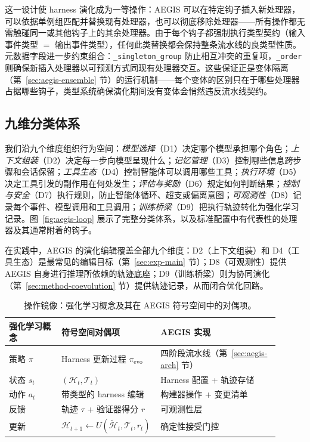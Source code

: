 这一设计使 harness 演化成为一等操作：AEGIS 可以在特定钩子插入新处理器，可以依据单例组匹配并替换现有处理器，也可以彻底移除处理器——所有操作都无需触碰同一或其他钩子上的其余处理器。由于每个钩子都强制执行类型契约（输入事件类型 $=$ 输出事件类型），任何此类替换都会保持整条流水线的良类型性质。元数据字段进一步约束组合：\texttt{\_singleton\_group} 防止相互冲突的重复项，\texttt{\_order} 则确保新插入处理器以可预测方式同现有处理器交互。这些保证正是变体隔离（第~\ref{sec:aegis-ensemble} 节）的运行机制——每个变体的区别只在于哪些处理器占据哪些钩子，类型系统确保演化期间没有变体会悄然违反流水线契约。

\subsection{九维分类体系}
\label{sec:foundry-taxonomy}

我们沿九个维度组织行为空间：\textit{模型选择}（D1）决定哪个模型承担哪个角色；\textit{上下文组装}（D2）决定每一步向模型呈现什么；\textit{记忆管理}（D3）控制哪些信息跨步骤和会话保留；\textit{工具生态}（D4）控制智能体可以调用哪些工具；\textit{执行环境}（D5）决定工具引发的副作用在何处发生；\textit{评估与奖励}（D6）规定如何判断结果；\textit{控制与安全}（D7）执行规则，防止智能体循环、超支或偏离意图；\textit{可观测性}（D8）记录每个事件、模型调用和工具调用；\textit{训练桥梁}（D9）把执行轨迹转化为强化学习记录。图~\ref{fig:aegis-loop} 展示了完整分类体系，以及标准配置中有代表性的处理器及其通常附着的钩子。

在实践中，AEGIS 的演化编辑覆盖全部九个维度：D2（上下文组装）和 D4（工具生态）是最常见的编辑目标（第~\ref{sec:exp-main} 节）；D8（可观测性）提供 AEGIS 自身进行推理所依赖的轨迹底座；D9（训练桥梁）则为协同演化（第~\ref{sec:method-coevolution} 节）提供轨迹记录，从而闭合优化回路。

\begin{table}[!htbp]
\centering
\small
\begin{tabular}{p{0.19\linewidth}p{0.28\linewidth}p{0.43\linewidth}}
\toprule
\textbf{强化学习概念} & \textbf{符号空间对偶项} & \textbf{AEGIS 实现} \\
\midrule
策略 $\pi$ & Harness 更新过程 $\pi_{\mathrm{evo}}$ & 四阶段流水线（第~\ref{sec:aegis-arch} 节） \\
状态 $s_t$ & $(\mathcal{H}_t,\mathcal{T}_t)$ & Harness 配置 + 轨迹存储 \\
动作 $a_t$ & 带类型的 harness 编辑 & 构建器操作 + 变更清单 \\
反馈 & 轨迹 $\tau$ + 验证器得分 $r$ & 可观测性层 \\
更新 & $\mathcal{H}_{t+1}\leftarrow U(\widetilde{\mathcal{H}}_t,\mathcal{T}_t,r_t)$ & 确定性接受门控 \\
\bottomrule
\end{tabular}
\caption{操作镜像：强化学习概念及其在 AEGIS 符号空间中的对偶项。}
\label{tab:operational-mirror}
\end{table}


